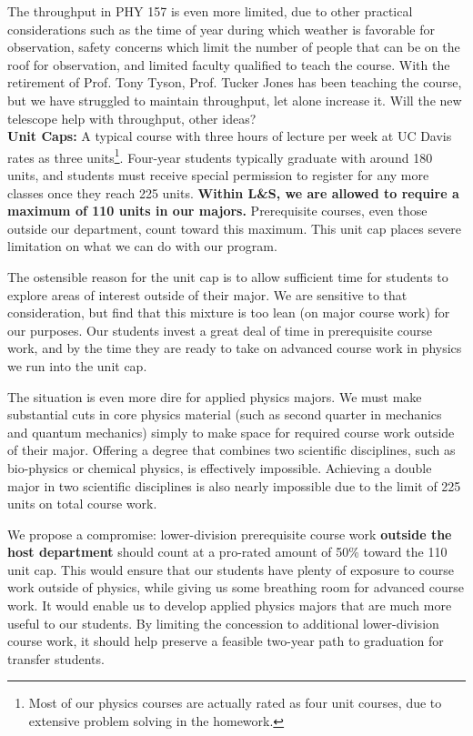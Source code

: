 \documentclass[12pt]{article}
\begin{document}
The throughput in PHY 157 is even more limited, due to other practical
considerations such as the time of year during which weather is
favorable for observation, safety concerns which limit the number of
people that can be on the roof for observation, and limited faculty
qualified to teach the course.  With the retirement of Prof. Tony
Tyson, Prof. Tucker Jones has been teaching the course, but we have
struggled to maintain throughput, let alone increase it.  {\color{red}
  Will the new telescope help with throughput, other ideas?}\\[3pt]

\noindent
{\bf Unit Caps:} A typical course with three hours of lecture per week
at UC Davis rates as three units\footnote{Most of our physics courses
  are actually rated as four unit courses, due to extensive problem
  solving in the homework.}.  Four-year students typically graduate
with around 180 units, and students must receive special permission to
register for any more classes once they reach 225 units.  {\bf Within
  L\&S, we are allowed to require a maximum of 110 units in our
  majors.} Prerequisite courses, even those outside our department,
count toward this maximum.  This unit cap places severe limitation on
what we can do with our program.

The ostensible reason for the unit cap is to allow sufficient time for
students to explore areas of interest outside of their major.  We are
sensitive to that consideration, but find that this mixture is too
lean (on major course work) for our purposes.  Our students invest a
great deal of time in prerequisite course work, and by the time they
are ready to take on advanced course work in physics we run into the
unit cap.

The situation is even more dire for applied physics majors.  We must
make substantial cuts in core physics material (such as second quarter
in mechanics and quantum mechanics) simply to make space for required
course work outside of their major.  Offering a degree that combines
two scientific disciplines, such as bio-physics or chemical physics,
is effectively impossible.  Achieving a double major in two scientific
disciplines is also nearly impossible due to the limit of 225 units on
total course work.

We propose a compromise: lower-division prerequisite course work {\bf
  outside the host department} should count at a pro-rated amount of
50\% toward the 110 unit cap.  This would ensure that our students
have plenty of exposure to course work outside of physics, while
giving us some breathing room for advanced course work.  It would
enable us to develop applied physics majors that are much more useful
to our students.  By limiting the concession to additional
lower-division course work, it should help preserve a feasible
two-year path to graduation for transfer students.
\end{document}
